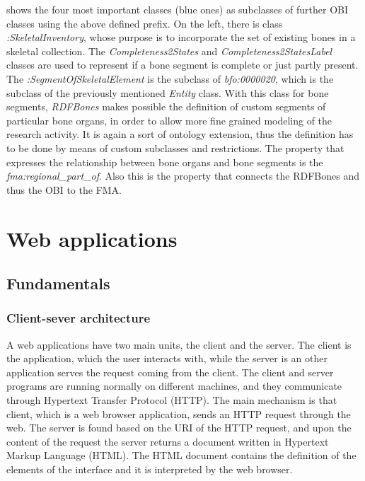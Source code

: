  shows the four most important classes (blue ones) as subclasses of further OBI classes using the above defined prefix. On the left, there is class \textit{:SkeletalInventory}, whose purpose is to incorporate the set of existing bones in a skeletal collection. The \textit{Completeness2States} and \textit{Completeness2StatesLabel} classes are used to represent if a bone segment is complete or just partly present. The \textit{:SegmentOfSkeletalElement} is the subclass of \textit{bfo:0000020}, which is the subclass of the previously mentioned \textit{Entity} class. With this class for bone segments, \textit{RDFBones} makes possible the definition of custom segments of particular bone organs, in order to allow more fine grained modeling of the research activity. It is again a sort of ontology extension, thus the definition has to be done by means of custom subclasses and restrictions. The property that expresses the relationship between bone organs and bone segments is the \textit{fma:regional\_part\_of}. Also this is the property that connects the RDFBones and thus the OBI to the FMA.



\section{Web applications}

\subsection{Fundamentals} \label{fundamentals}

\subsubsection{Client-sever architecture} \label{clientServer}

A web applications have two main units, the client and the server. The client is the application, which the user interacts with, while the server is an other application serves the request coming from the client. The client and server programs are running normally on different machines, and they communicate through Hypertext Transfer Protocol (HTTP). The main mechanism is that client, which is a web browser application, sends an HTTP request through the web. The server is found based on the URI of the HTTP request, and upon the content of the request the server returns a document written in Hypertext Markup Language (HTML). The HTML document contains the definition of the elements of the interface and it is interpreted by the web browser.

